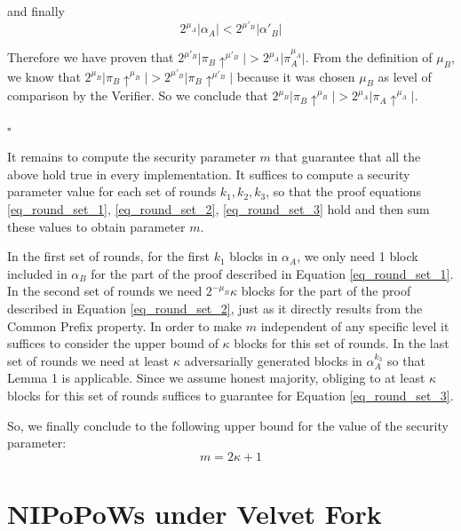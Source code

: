 \documentclass[11pt,a4paper]{article}
\begin{document}
and finally 
\begin{equation}
2^{\mu_A} \vert \alpha_A \vert < 2^{\mu'_B} \vert \alpha'{_B} \vert
\end{equation}


Therefore we have proven that $2^{\mu'_B} \vert \pi_B \uparrow^{\mu'_B} \vert > 2^{\mu_A} \vert \pi_A^{\mu_A} \vert$. From the definition of $\mu_B$, we know that $2^{\mu_B} \vert \pi_B \uparrow^{\mu_B} \vert > 2^{\mu'_B} \vert \pi_B \uparrow^{\mu'_B} \vert$ because it was chosen $\mu_B$ as level of comparison by the Verifier. So we conclude that $2^{\mu_B} \vert \pi_B \uparrow^{\mu_B} \vert > 2^{\mu_A} \vert \pi_A \uparrow^{\mu_A} \vert$.

\begin{flushright}
$\square$
\end{flushright}

It remains to compute the security parameter $m$ that guarantee that all the above hold true in every implementation. It suffices to compute a security parameter value for each set of rounds $k_1, k_2, k_3$, so that the proof equations \ref{eq_round_set_1}, \ref{eq_round_set_2}, \ref{eq_round_set_3} hold and then sum these values to obtain parameter $m$.

In the first set of rounds, for the first $k_1$ blocks in $\alpha_A$, we only need 1 block included in $\alpha_B$ for the part of the proof described in Equation \ref{eq_round_set_1}. In the second set of rounds we need $2^{-\mu_B}\kappa$ blocks for the part of the proof described in Equation \ref{eq_round_set_2}, just as it directly results from the Common Prefix property. In order to make $m$ independent of any specific level it suffices to consider the upper bound of $\kappa$ blocks for this set of rounds. In the last set of rounds we need at least $\kappa$ adversarially generated blocks in $\alpha_A^{k_3}$ so that Lemma 1 is applicable. Since we assume honest majority, obliging to at least $\kappa$ blocks for this set of rounds suffices to guarantee for Equation \ref{eq_round_set_3}.

So, we finally conclude to the following upper bound for the value of the
 security parameter:
\begin{equation}
m = 2\kappa + 1 
\end{equation}
 
\section{NIPoPoWs under Velvet Fork}
\end{document}

